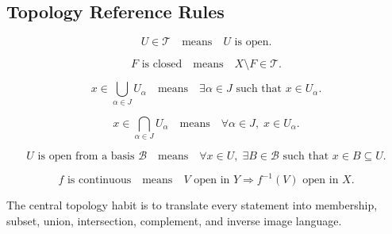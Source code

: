\documentclass{article}
\begin{document}
	\subsection{Topology Reference Rules}
	
	$$
	U\in\mathcal{T}
	\quad\text{means}\quad
	U\text{ is open.}
	$$
	
	$$
	F\text{ is closed}
	\quad\text{means}\quad
	X\setminus F\in\mathcal{T}.
	$$
	
	$$
	x\in\bigcup_{\alpha\in J}U_\alpha
	\quad\text{means}\quad
	\exists \alpha\in J\text{ such that }x\in U_\alpha.
	$$
	
	$$
	x\in\bigcap_{\alpha\in J}U_\alpha
	\quad\text{means}\quad
	\forall \alpha\in J,\; x\in U_\alpha.
	$$
	
	$$
	U\text{ is open from a basis }\mathcal{B}
	\quad\text{means}\quad
	\forall x\in U,\; \exists B\in\mathcal{B}\text{ such that }x\in B\subseteq U.
	$$
	
	$$
	f\text{ is continuous}
	\quad\text{means}\quad
	V\text{ open in }Y\Rightarrow f^{-1}(V)\text{ open in }X.
	$$
	
	The central topology habit is to translate every statement into membership, subset, union, intersection, complement, and inverse image language.
\end{document}
